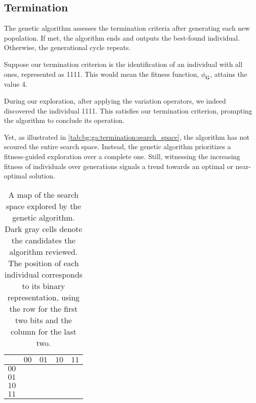 \subsection{Termination}
\label{sec:genetic_algorithms:termination}
  The genetic algorithm assesses the termination criteria after generating each 
  new population.
  If met, the algorithm ends and outputs the best-found individual.
  Otherwise, the generational cycle repeats.

  Suppose our termination criterion is the identification of an individual with 
  all ones, represented as 1111.
  This would mean the fitness function, \(\phi_\mathbf{G}\), attains the value 
  4.

  During our exploration, after applying the variation operators, we indeed 
  discovered the individual 1111.
  This satisfies our termination criterion, prompting the algorithm to conclude 
  its operation.

  Yet, as illustrated in \vref{tab:bg:ga:termination:search_space}, the 
  algorithm has not scoured the entire search space.
  Instead, the genetic algorithm prioritizes a fitness-guided exploration over 
  a complete one.
  Still, witnessing the increasing fitness of individuals over generations 
  signals a trend towards an optimal or near-optimal solution.

  \begin{table}[ht!]
    \centering
    \begin{tabular}{|c||c|c|c|c|}
      \hline
            & $00$ & $01$ & $10$ & $11$ \\
      \hline
      \hline
      $00$  & \cellcolor{darkgray}  & \cellcolor{darkgray} 
        & \cellcolor{darkgray}  & \\
      \hline
      $01$  & \cellcolor{darkgray}  & \cellcolor{darkgray}  
        &                       & \\
      \hline
      $10$  &                       &                       
        & \cellcolor{darkgray}  & \\
      \hline
      $11$  & \cellcolor{darkgray}  & \cellcolor{darkgray}  
        &                       & \cellcolor{darkgray} \\
      \hline
    \end{tabular}
    \caption{
      A map of the search space explored by the genetic algorithm.
      Dark gray cells denote the candidates the algorithm reviewed.
      The position of each individual corresponds to its binary representation, 
      using the row for the first two bits and the column for the last two.
    }
    \label{tab:bg:ga:termination:search_space}
  \end{table}


